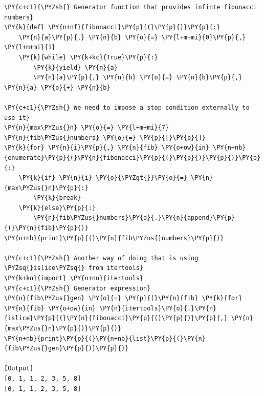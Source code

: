 \begin{Verbatim}[label=\makebox{\url{https://github.com/lucabaldini/cmepda/tree/master/slides/latex/snippets/fibonacci.py}},commandchars=\\\{\}]
\PY{c+c1}{\PYZsh{} Generator function that provides infinte fibonacci numbers}
\PY{k}{def} \PY{n+nf}{fibonacci}\PY{p}{(}\PY{p}{)}\PY{p}{:}
    \PY{n}{a}\PY{p}{,} \PY{n}{b} \PY{o}{=} \PY{l+m+mi}{0}\PY{p}{,} \PY{l+m+mi}{1}
    \PY{k}{while} \PY{k+kc}{True}\PY{p}{:}
        \PY{k}{yield} \PY{n}{a}
        \PY{n}{a}\PY{p}{,} \PY{n}{b} \PY{o}{=} \PY{n}{b}\PY{p}{,} \PY{n}{a} \PY{o}{+} \PY{n}{b}

\PY{c+c1}{\PYZsh{} We need to impose a stop condition externally to use it}
\PY{n}{max\PYZus{}n} \PY{o}{=} \PY{l+m+mi}{7}
\PY{n}{fib\PYZus{}numbers} \PY{o}{=} \PY{p}{[}\PY{p}{]}
\PY{k}{for} \PY{n}{i}\PY{p}{,} \PY{n}{fib} \PY{o+ow}{in} \PY{n+nb}{enumerate}\PY{p}{(}\PY{n}{fibonacci}\PY{p}{(}\PY{p}{)}\PY{p}{)}\PY{p}{:}
    \PY{k}{if} \PY{n}{i} \PY{o}{\PYZgt{}}\PY{o}{=} \PY{n}{max\PYZus{}n}\PY{p}{:}
        \PY{k}{break}
    \PY{k}{else}\PY{p}{:}
        \PY{n}{fib\PYZus{}numbers}\PY{o}{.}\PY{n}{append}\PY{p}{(}\PY{n}{fib}\PY{p}{)}
\PY{n+nb}{print}\PY{p}{(}\PY{n}{fib\PYZus{}numbers}\PY{p}{)}
      
\PY{c+c1}{\PYZsh{} Another way of doing that is using \PYZsq{}islice\PYZsq{} from itertools}
\PY{k+kn}{import} \PY{n+nn}{itertools}
\PY{c+c1}{\PYZsh{} Generator expression}
\PY{n}{fib\PYZus{}gen} \PY{o}{=} \PY{p}{(}\PY{n}{fib} \PY{k}{for} \PY{n}{fib} \PY{o+ow}{in} \PY{n}{itertools}\PY{o}{.}\PY{n}{islice}\PY{p}{(}\PY{n}{fibonacci}\PY{p}{(}\PY{p}{)}\PY{p}{,} \PY{n}{max\PYZus{}n}\PY{p}{)}\PY{p}{)}
\PY{n+nb}{print}\PY{p}{(}\PY{n+nb}{list}\PY{p}{(}\PY{n}{fib\PYZus{}gen}\PY{p}{)}\PY{p}{)}

[Output]
[0, 1, 1, 2, 3, 5, 8]
[0, 1, 1, 2, 3, 5, 8]
\end{Verbatim}